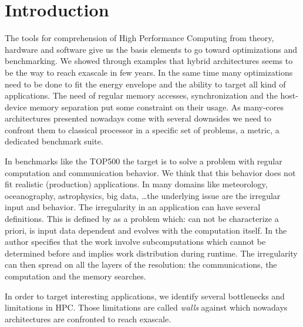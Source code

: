 
\chapter*{Introduction}

The tools for comprehension of High Performance Computing from theory, hardware and software give us the basis elements to go toward optimizations and benchmarking. 
We showed through examples that hybrid architectures seems to be the way to reach exascale in few years.
In the same time many optimizations need to be done to fit the energy envelope and the ability to target all kind of applications. 
The need of regular memory accesses, synchronization and the host-device memory separation put some constraint on their usage.
As many-cores architectures presented nowadays come with several downsides we need to confront them to classical processor in a specific set of problems, a metric, a dedicated benchmark suite. 


In benchmarks like the TOP500 the target is to solve a problem with regular computation and communication behavior. 
We think that this behavior does not fit realistic (production) applications.
In many domains like meteorology, oceanography, astrophysics, big data, \dots the underlying issue are the irregular input and behavior.
The irregularity in an application can have several definitions. 
This is defined by \cite{javairregular} as a problem which: can not be characterize a priori, is input data dependent and evolves with the computation itself. 
In \cite{suss2006implementing} the author specifies that the work involve subcomputations which cannot be determined before and implies work distribution during runtime.
The irregularity can then spread on all the layers of the resolution:
the communications, the computation and the memory searches. 

In order to target interesting applications, we identify several bottlenecks and limitations in HPC. 
Those limitations are called \textit{walls} against which nowadays architectures are confronted to reach exascale. 

